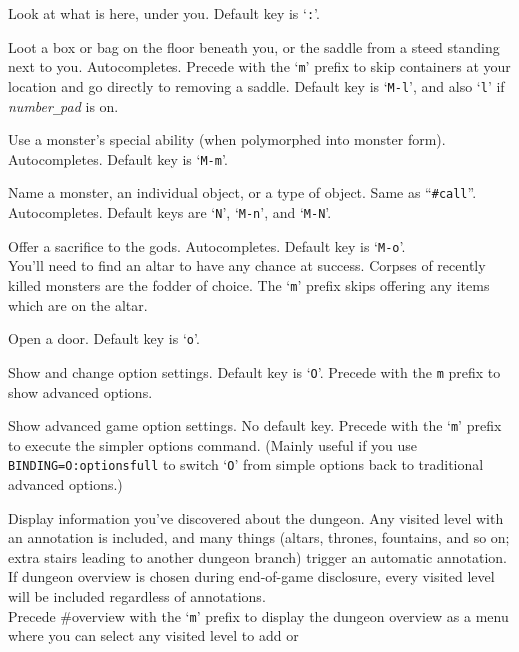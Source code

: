\item[\tb{\#look}]
Look at what is here, under you. Default key is `{\tt :}'.
\item[\tb{\#loot}]
Loot a box or bag on the floor beneath you, or the saddle
from a steed standing next to you. Autocompletes.
Precede with the `{\tt m}' prefix to skip containers at your location
and go directly to removing a saddle.
Default key is `{\tt M-l}',
and also `{\tt l}' if {\it number\verb+_+pad\/} is on.
\item[\tb{\#monster}]
Use a monster's special ability (when polymorphed into monster form).
Autocompletes. Default key is `{\tt M-m}'.
\item[\tb{\#name}]
Name a monster, an individual object, or a type of object.
Same as ``{\tt \#call}''.
Autocompletes.
Default keys are `{\tt N}', `{\tt M-n}', and `{\tt M-N}'.
\item[\tb{\#offer}]
Offer a sacrifice to the gods. Autocompletes. Default key is `{\tt M-o}'.\\
You'll need to find an altar to have any chance at success.
Corpses of recently killed monsters are the fodder of choice.
The `{\tt m}' prefix skips offering any items which are on the altar.\\
\item[\tb{\#open}]
Open a door. Default key is `{\tt o}'.
\item[\tb{\#options}]
Show and change option settings. Default key is `{\tt O}'.
Precede with the {\tt m} prefix to show advanced options.
\item[\tb{\#optionsfull}]
Show advanced game option settings.
No default key.
Precede with the `{\tt m}' prefix to execute the simpler options command.
(Mainly useful if you use {\tt BINDING=O:optionsfull} to switch
`{\tt O}' from simple options back to traditional advanced options.)
\item[\tb{\#overview}]
Display information you've discovered about the dungeon.
Any visited level
with an annotation is included,
and many things (altars, thrones, fountains, and so on; extra stairs
leading to another dungeon branch) trigger an automatic annotation.
If dungeon overview is chosen during end-of-game disclosure, every visited
level will be included regardless of annotations.
\\
Precede \#overview with the `{\tt m}' prefix to display the dungeon
overview as a menu where you can select any visited level to add or

